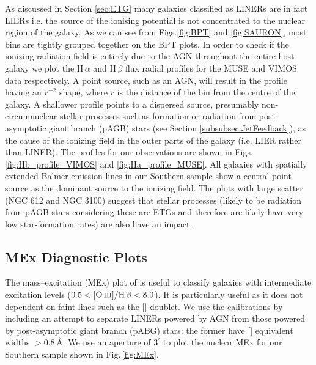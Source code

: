		As discussed in Section \ref{sec:ETG} many galaxies classified as LINERs are in fact LIERs \citep[e.g.][]{Sarzi2005, Sarzi2010, Singh2013, Belfiore2016} i.e. the source of the ionising potential is not concentrated to the nuclear region of the galaxy. As we can see from Figs.\ref{fig:BPT} and \ref{fig:SAURON}, most bins are tightly grouped together on the BPT plots. In order to check if the ionizing radiation field is entirely due to the AGN throughout the entire host galaxy we plot the H\,$\alpha$ and H\,$\beta$ flux radial profiles for the MUSE and VIMOS data respectively. A point source, such as an AGN, will result in the profile having an $r^{-2}$ shape, where $r$ is the distance of the bin from the centre of the galaxy. A shallower profile points to a dispersed source, presumably non-circumnuclear stellar processes such as formation or radiation from post-asymptotic giant branch (pAGB) stars (see Section \ref{subsubsec:JetFeedback}), as the cause of the ionizing field in the outer parts of the galaxy (i.e. LIER rather than LINER). The profiles for our observations are shown in Figs.\,\ref{fig:Hb_profile_VIMOS} and \ref{fig:Ha_profile_MUSE}. All galaxies with spatially extended Balmer emission lines in our Southern sample show a central point source as the dominant source to the ionizing field. The plots with large scatter (NGC 612 and NGC 3100) suggest that stellar processes (likely to be radiation from pAGB stars considering these are ETGs and therefore are likely have very low star-formation rates) are also have an impact.

		


	\subsection{MEx Diagnostic Plots}
		\label{subsec:MEx}
		The mass--excitation (MEx) plot of \citet{Juneau2011} is useful to classify galaxies with intermediate excitation levels ($0.5 < \mathrm{[\ion{O}{iii}]/H\,\beta} < 8.0$). It is particularly useful as it does not dependent on faint lines such as the [] doublet. We use the calibrations by \citet{Nyland2016} including an attempt to separate LINERs powered by AGN from those powered by post-asymptotic giant branch (pABG) stars: the former have [] equivalent widths $>0.8$\,\AA. We use an aperture of 3$^\prime$ to plot the nuclear MEx for our Southern sample shown in Fig.\,\ref{fig:MEx}. 


